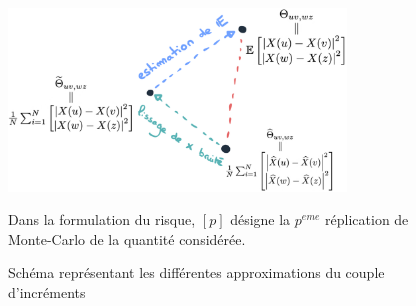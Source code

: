 \begin{figure}[H]
	\centering
	\begin{minipage}{0.65\textwidth}
		\includegraphics[width=0.8\textwidth]{Images/sketches/theta_biais.png}
	\end{minipage}
	\begin{minipage}{0.3\textwidth}
		Dans la formulation du risque, 
		$[p]$ désigne la $p^{eme}$ réplication de Monte-Carlo de la quantité considérée.
	\end{minipage}
	\caption{Schéma représentant les différentes approximations du couple d'incréments}
	\label{fig:sketch_theta_biais_corpus}
\end{figure}
